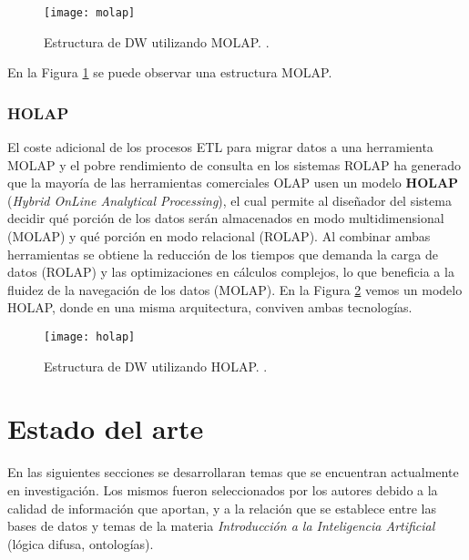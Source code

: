 \documentclass[a4paper,11pt]{article}
\begin{document}
    \begin{figure}
      \begin{center}
        \texttt{[image: molap]}
        \caption{Estructura de DW utilizando MOLAP. \cite[p.~81]{nagabhushana}.}
        \label{molap}
      \end{center}
    \end{figure}
    
    En la Figura \ref{molap} se puede observar una estructura MOLAP.
    
    \subsubsection{HOLAP}

    El coste adicional de los procesos ETL para migrar datos a una herramienta MOLAP y el pobre rendimiento de consulta en los sistemas ROLAP ha generado que la
    mayoría de las herramientas comerciales OLAP usen un modelo \textbf{HOLAP} (\textit{Hybrid OnLine Analytical Processing}), el cual permite al diseñador del sistema
    decidir qué porción de los datos serán almacenados en modo multidimensional (MOLAP) y qué porción en modo relacional (ROLAP). Al combinar ambas herramientas
    se obtiene la reducción de los tiempos que demanda la carga de datos (ROLAP) y las optimizaciones en cálculos complejos, lo que beneficia a la fluidez de la
    navegación de los datos (MOLAP). En la Figura \ref{holap} vemos un modelo HOLAP, donde en una misma arquitectura, conviven ambas tecnologías.
    
    \begin{figure}
      \begin{center}
        \texttt{[image: holap]}
        \caption{Estructura de DW utilizando HOLAP. \cite[p.~82]{nagabhushana}.}
        \label{holap}
      \end{center}
    \end{figure}


  
    \section{Estado del arte} \label{estado_arte}
    
    En las siguientes secciones se desarrollaran temas que se encuentran actualmente en investigación. Los mismos fueron seleccionados por los autores
    debido a la calidad de información que aportan, y a la relación que se establece entre las bases de datos y temas de la materia
    \textit{Introducción a la Inteligencia Artificial} (lógica difusa, ontologías).
    
\end{document}
